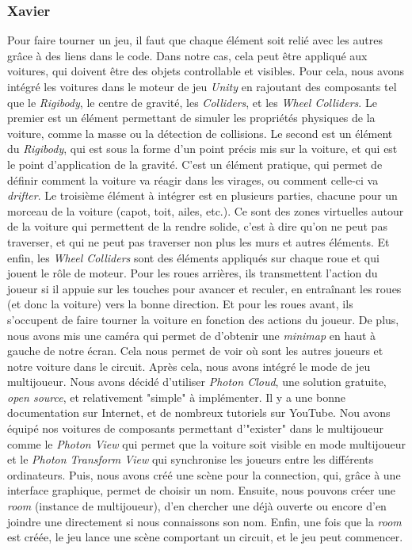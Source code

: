 \documentclass[12pt,a4paper]{article}
\begin{document}
    \subsubsection{Xavier}
        Pour faire tourner un jeu, il faut que chaque élément soit relié avec
        les autres grâce à des liens dans le code. Dans notre cas, cela peut être
        appliqué aux voitures, qui doivent être des objets controllable et visibles.
        Pour cela, nous avons intégré les voitures dans le moteur de jeu \textsl{Unity}
        en rajoutant des composants tel que le \textit{Rigibody}, le centre de gravité,
        les \textit{Colliders}, et les \textit{Wheel Colliders}. Le premier est un élément
        permettant de simuler les propriétés physiques de la voiture, comme la masse ou la
        détection de collisions. Le second est un élément du \textit{Rigibody}, qui est sous
        la forme d'un point précis mis sur la voiture, et qui est le point d'application
        de la gravité. C'est un élément pratique, qui permet de définir comment la
        voiture va réagir dans les virages, ou comment celle-ci va \textit{drifter}.
        Le troisième élément à intégrer est en plusieurs parties, chacune pour un morceau
        de la voiture (capot, toit, ailes, etc.). Ce sont des zones virtuelles autour
        de la voiture qui permettent de la rendre solide, c'est à dire qu'on ne peut pas
        traverser, et qui ne peut pas traverser non plus les murs et autres éléments.
        Et enfin, les \textit{Wheel Colliders} sont des éléments appliqués sur chaque roue
        et qui jouent le rôle de moteur. Pour les roues arrières, ils transmettent l'action
        du joueur si il appuie sur les touches pour avancer et reculer, en entraînant les
        roues (et donc la voiture) vers la bonne direction. Et pour les roues avant,
        ils s'occupent de faire tourner la voiture en fonction des actions du joueur.
        De plus, nous avons mis une caméra qui permet de d'obtenir une \textit{minimap}
        en haut à gauche de notre écran. Cela nous permet de voir où sont les autres
        joueurs et notre voiture dans le circuit.
        Après cela, nous avons intégré le mode de jeu multijoueur. Nous avons décidé
        d'utiliser \textsl{Photon Cloud}, une solution gratuite, \textit{open source},
        et relativement "simple" à implémenter. Il y a une bonne documentation sur
        Internet, et de nombreux tutoriels sur YouTube. Nou avons équipé nos voitures
        de composants permettant d'"exister" dans le multijoueur comme le \textit{Photon View}
        qui permet que la voiture soit visible en mode multijoueur et le \textit{Photon
        Transform View} qui synchronise les joueurs entre les différents ordinateurs.
        Puis, nous avons 
        créé une scène pour la connection, qui, grâce à une interface graphique,
        permet de choisir un nom. Ensuite, nous pouvons créer une \textit{room}
        (instance de multijoueur), d'en chercher une déjà ouverte ou encore
        d'en joindre une directement si nous connaissons son nom. Enfin, une
        fois que la \textit{room} est créée, le jeu lance une scène comportant
        un circuit, et le jeu peut commencer.
\clearpage
\end{document}
